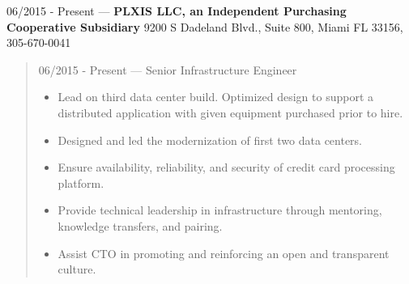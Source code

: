 06/2015 - Present --- {\bf PLXIS LLC, an Independent Purchasing Cooperative Subsidiary} 9200 S Dadeland Blvd., Suite 800, Miami FL 33156, 305-670-0041
\begin{quote}
06/2015 - Present --- Senior Infrastructure Engineer\\
\begin{itemize}
\item Lead on third data center build.  Optimized design to support a distributed application with given equipment purchased prior to hire.
\item Designed and led the modernization of first two data centers.
\item Ensure availability, reliability, and security of credit card processing platform.
\item Provide technical leadership in infrastructure through mentoring, knowledge transfers, and pairing.
\item Assist CTO in promoting and reinforcing an open and transparent culture.
\end{itemize}
\end{quote}
